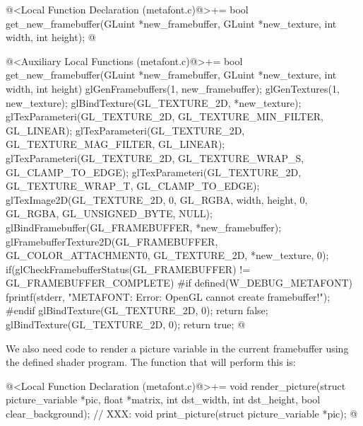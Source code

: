 {{{{{\iniciocodigo
@<Local Function Declaration (metafont.c)@>+=
bool get_new_framebuffer(GLuint *new_framebuffer, GLuint *new_texture,
                         int width, int height);
@
\fimcodigo

\iniciocodigo
@<Auxiliary Local Functions (metafont.c)@>+=
bool get_new_framebuffer(GLuint *new_framebuffer, GLuint *new_texture,
                         int width, int height){
  glGenFramebuffers(1, new_framebuffer);
  glGenTextures(1, new_texture);
  glBindTexture(GL_TEXTURE_2D, *new_texture);
  glTexParameteri(GL_TEXTURE_2D, GL_TEXTURE_MIN_FILTER, GL_LINEAR);
  glTexParameteri(GL_TEXTURE_2D, GL_TEXTURE_MAG_FILTER, GL_LINEAR);
  glTexParameteri(GL_TEXTURE_2D, GL_TEXTURE_WRAP_S, GL_CLAMP_TO_EDGE);
  glTexParameteri(GL_TEXTURE_2D, GL_TEXTURE_WRAP_T, GL_CLAMP_TO_EDGE);
  glTexImage2D(GL_TEXTURE_2D, 0, GL_RGBA, width, height, 0, GL_RGBA,
               GL_UNSIGNED_BYTE, NULL);
  glBindFramebuffer(GL_FRAMEBUFFER, *new_framebuffer);
  glFramebufferTexture2D(GL_FRAMEBUFFER, GL_COLOR_ATTACHMENT0, GL_TEXTURE_2D,
                         *new_texture, 0);
  if(glCheckFramebufferStatus(GL_FRAMEBUFFER) != GL_FRAMEBUFFER_COMPLETE){
#if defined(W_DEBUG_METAFONT)
    fprintf(stderr, "METAFONT: Error: OpenGL cannot create framebuffer!\n");
#endif
    glBindTexture(GL_TEXTURE_2D, 0);
    return false;
  }
  glBindTexture(GL_TEXTURE_2D, 0);
  return true;
}
@
\fimcodigo

We also need code to render a picture variable in the current
framebuffer using the defined shader program. The function that will
perform this is:

\iniciocodigo
@<Local Function Declaration (metafont.c)@>+=
void render_picture(struct picture_variable *pic, float *matrix, int dst_width,
                    int dst_height, bool clear_background);
// XXX:
void print_picture(struct picture_variable *pic);
@
\fimcodigo

}}}}}
